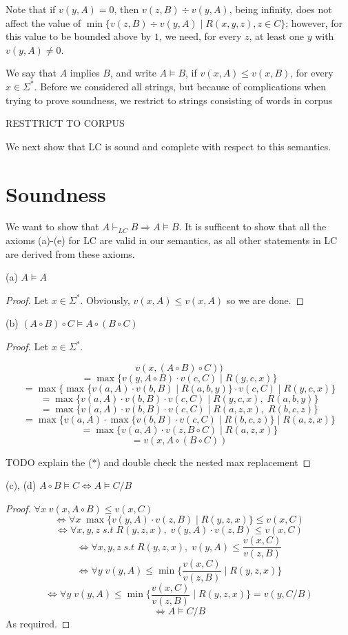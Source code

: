\documentclass[11pt]{article}
\begin{document}
Note that if $v(y,A) = 0$, then $v(z, B) \div v(y, A)$, being infinity, does not
affect the value of $\min \{ v(z, B) \div v(y, A) \mid R(x, y, z), z \in C \}$;
however, for this value to be bounded above by $1$,  we need, for every $z$, at
least one $y$ with  $v(y,A) \ne 0$.

We say that $A$ implies $B$, and write $A \models B$, if $v(x, A) \leqslant
v(x,B)$, for every $x \in \Sigma^\ast$. {\color{red} Before we considered all strings, but because of complications when trying to prove soundness, we restrict to strings consisting of words in corpus}

RESTTRICT TO CORPUS

We next show that LC is sound and complete with respect to this semantics.

\section{Soundness}

We want to show that $A \vdash_{LC} B \Rightarrow A \models B$. It is sufficent to show that all the axioms (a)-(e) for LC are valid in our semantics, as all other statements in LC are derived from these axioms. 

(a) $A \models A$
\begin{proof}
Let $x \in \Sigma^\ast$. Obviously, $v(x, A) \leq v(x, A)$ so we are done.
\end{proof}

(b) $(A \circ B) \circ C \models A \circ (B \circ C)$
\begin{proof}
Let $x \in \Sigma^\ast$. 

\[ v(x, (A \circ B) \circ C))\]
\[ = \max \{ v(y, A \circ B) \cdot v(c, C) \mid R(y, c, x) \}\]
\[ = \max \{ \max \{ v(a, A) \cdot v(b, B) \mid R(a, b, y) \} \cdot v(c, C) \mid R(y, c, x) \}\]
\[ = \max \{ v(a, A) \cdot v(b, B)  \cdot v(c, C) \mid R(y, c, x), \; R(a, b, y)\}\]
\[ = \max \{ v(a, A) \cdot v(b, B)  \cdot v(c, C) \mid R(a, z, x), \; R(b, c, z)\}  \tag{
$\ast$}\]
\[ = \max\{v(a, A) \cdot  \max \{ v(b, B) \cdot v(c, C) \mid R(b, c, z) \} \mid R(a, z, x) \}\]
\[ = \max \{ v(a, A) \cdot v(z, B \circ C) \mid R(a, z, x) \}\]
\[ = v(x, A \circ (B \circ C))\]

{\color{red}TODO explain the ($\ast$) and double check the nested max replacement}

\end{proof}

(c), (d) $A \circ B \models C \iff A \models C/B$
\begin{proof}

$\forall x\; v(x, A \circ B) \leq v(x, C)$
\[\iff \forall x\; \max \{ v(y, A) \cdot v(z, B) \mid R(y, z, x) \} \leq v(x, C)\]
\[\iff \forall x, y, z \; s.t \; R(y, z, x), \; v(y, A) \cdot v(z, B) \leq v(x, C)\]
\[\iff \forall x, y, z \; s.t \; R(y, z, x), \; v(y, A) \leq \frac{v(x, C)}{v(z, B)}\]
\[\iff \forall y \; v(y, A) \leq \min \{ \frac{v(x, C)}{v(z, B)} \mid R(y, z, x) \}\]
\[\iff \forall y \; v(y, A) \leq \min \{ \frac{v(x, C)}{v(z, B)} \mid R(y, z, x)\} = v(y, C/B) \tag{$\ast$ $\ast$} \] 
\[\iff A \models C/B\]
As required.
\end{proof}
\end{document}
